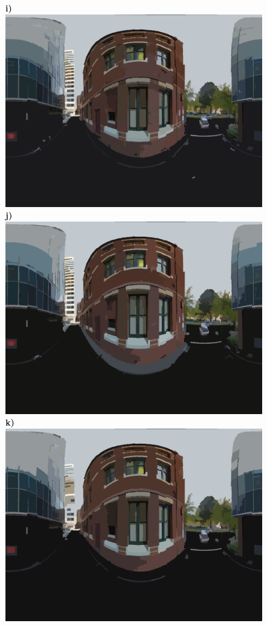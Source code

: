 \documentclass[final,3p,times,authoryear]{elsarticle}
\begin{document}
\begin{figure}
\textbf{i)}\includegraphics[scale=0.08]{Images/mean/0070_3_6_100.png} 
\textbf{j)}\includegraphics[scale=0.08]{Images/mean/0070_7_6_100.png} 
\textbf{k)}\includegraphics[scale=0.08]{Images/mean/0070_5_7_210.png} 

\end{figure}
\end{document}
